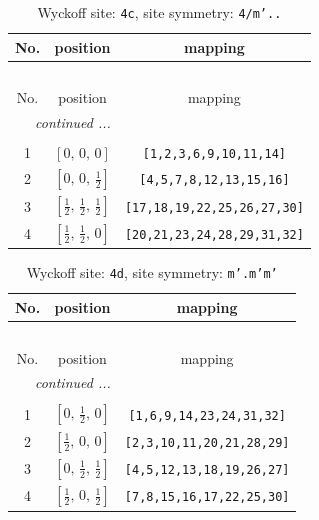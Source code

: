 \documentclass[fleqn,8pt]{jsarticle}
\begin{document}
\renewcommand{\arraystretch}{1.2}
\begin{longtable}{ccc}
\caption{Wyckoff site: {\tt 4c}, site symmetry: {\tt 4/m'..}}
 \\
 \hline \hline
No. & position & mapping \\ \hline \endfirsthead

\multicolumn{2}{l}{\tablename\ \thetable{}} \\
 \hline \hline
No. & position & mapping \\ \hline \endhead

 \hline \hline
\multicolumn{2}{r}{\footnotesize\it continued ...} \\ \endfoot

 \hline \hline
\multicolumn{2}{r}{} \\ \endlastfoot

1 & $\left[ 0,\, 0,\, 0 \right]$ & {\tt [1,2,3,6,9,10,11,14]} \\ \hline
2 & $\left[ 0,\, 0,\, \frac{1}{2} \right]$ & {\tt [4,5,7,8,12,13,15,16]} \\ \hline
3 & $\left[ \frac{1}{2},\, \frac{1}{2},\, \frac{1}{2} \right]$ & {\tt [17,18,19,22,25,26,27,30]} \\ \hline
4 & $\left[ \frac{1}{2},\, \frac{1}{2},\, 0 \right]$ & {\tt [20,21,23,24,28,29,31,32]} \\
\end{longtable}
\renewcommand{\arraystretch}{1.2}
\begin{longtable}{ccc}
\caption{Wyckoff site: {\tt 4d}, site symmetry: {\tt m'.m'm'}}
 \\
 \hline \hline
No. & position & mapping \\ \hline \endfirsthead

\multicolumn{2}{l}{\tablename\ \thetable{}} \\
 \hline \hline
No. & position & mapping \\ \hline \endhead

 \hline \hline
\multicolumn{2}{r}{\footnotesize\it continued ...} \\ \endfoot

 \hline \hline
\multicolumn{2}{r}{} \\ \endlastfoot

1 & $\left[ 0,\, \frac{1}{2},\, 0 \right]$ & {\tt [1,6,9,14,23,24,31,32]} \\ \hline
2 & $\left[ \frac{1}{2},\, 0,\, 0 \right]$ & {\tt [2,3,10,11,20,21,28,29]} \\ \hline
3 & $\left[ 0,\, \frac{1}{2},\, \frac{1}{2} \right]$ & {\tt [4,5,12,13,18,19,26,27]} \\ \hline
4 & $\left[ \frac{1}{2},\, 0,\, \frac{1}{2} \right]$ & {\tt [7,8,15,16,17,22,25,30]} \\
\end{longtable}
\end{document}
